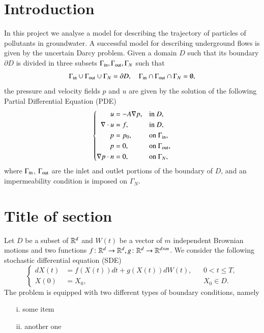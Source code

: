 \documentclass{article}
\date{\today}
\begin{document}
\hypersetup{pageanchor=false} 


\clearpage
\thispagestyle{empty}
\tableofcontents

\clearpage
\hypersetup{pageanchor=true} %
\setcounter{page}{1}

\section{Introduction}
In this project we analyse a model for describing the trajectory of particles of pollutants in groundwater. A successful model for describing underground flows is given by the uncertain Darcy problem. Given a domain $D$ such that its boundary $\partial D$ is divided in three subsets $\Gamma_{\rm in}, \Gamma_{\rm out}, \Gamma_N$ such that 
\begin{equation*}
	\Gamma_{\rm in} \cup \Gamma_{\rm out} \cup \Gamma_N = \partial D, \quad \Gamma_{\rm in} \cap \Gamma_{\rm out} \cap \Gamma_N = \emptyset,
\end{equation*} 
the pressure and velocity fields $p$ and $u$ are given by the solution of the following Partial Differential Equation (PDE)
\begin{equation}
	\label{eq:IntroDarcy}
	\left \{
	\begin{aligned}
		u &= -A \nabla p, && \text{in } D, \\
		\nabla\cdot u &= f, && \text{in } D, \\
		p &= p_0, && \text{on } \Gamma_{\rm in},\\
		p &= 0, && \text{on } \Gamma_{\rm out}, \\
		\nabla p \cdot n &= 0, && \text{on } \Gamma_N,
	\end{aligned} \right.
\end{equation}
where $\Gamma_{\rm in}$, $\Gamma_{\rm out}$ are the inlet and outlet portions of the boundary of $D$, and an impermeability condition is imposed on $\Gamma_N$.

\section{Title of section}
Let $D$ be a subset of $\mathbb{R}^d$ and $W(t)$ be a vector of $m$ independent Brownian motions and two functions $f\colon \mathbb{R}^d \rightarrow \mathbb{R}^d, g \colon \mathbb{R}^d \rightarrow \mathbb{R}^{d\times m}$. We consider the following stochastic differential equation (SDE)
\begin{equation}\label{eq:GeneralModel}
\left \{
\begin{aligned}
dX(t) &= f(X(t)) dt + g(X(t))dW(t), && 0 < t \leq T, \\
X(0)  &= X_0, && X_0 \in D.
\end{aligned} \right .
\end{equation}
The problem is equipped with two different types of boundary conditions, namely
\begin{itemize}
	\item[i.] some item
	\item[ii.] another one
\end{itemize}
\end{document}
